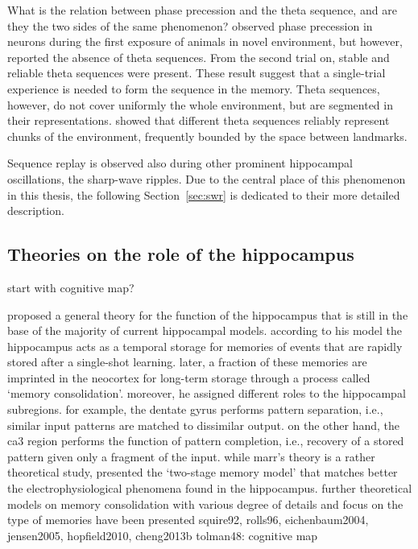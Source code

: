     What is the relation between phase precession and the theta sequence, and
    are they the two sides of the same phenomenon? \cite{Feng2015} observed
    phase precession in neurons during the first exposure of animals in novel
    environment, but however, reported the absence of theta sequences. From the
    second trial on, stable and reliable theta sequences were present. These
    result suggest that a single-trial experience is needed to form the
    sequence in the memory. Theta sequences, however, do not cover uniformly
    the whole environment, but are segmented in their representations. \cite{Gupta2012} 
    showed that different theta sequences reliably represent chunks of the environment,
    frequently bounded by the space between landmarks.

    Sequence replay is observed also during other prominent hippocampal
    oscillations, the sharp-wave ripples. Due to the central place of this
    phenomenon in this thesis, the following Section~\ref{sec:swr} is dedicated
    to their more detailed description.

  \subsection{Theories on the role of the hippocampus} 

    start with cognitive map?

    \citep{Marr1971} proposed a general theory for the function of the
    hippocampus that is still in the base of the majority of current
    hippocampal models. according to his model the hippocampus acts as a
    temporal storage for memories of events that are rapidly stored after a
    single-shot learning. later, a fraction of these memories are imprinted in
    the neocortex for long-term storage through a process called `memory
    consolidation'. moreover, he assigned different roles to the hippocampal
    subregions. for example, the dentate gyrus performs pattern separation,
    i.e., similar input patterns are matched to dissimilar output. on the other
    hand, the ca3 region performs the function of pattern completion, i.e.,
    recovery of a stored pattern given only a fragment of the input. while
    marr's theory is a rather theoretical study, \citep{buzsaki89} presented
    the `two-stage memory model' that matches better the electrophysiological
    phenomena found in the hippocampus. further theoretical models on memory
    consolidation with various degree of details and focus on the type of
    memories have been presented \cite{e.g.,}{}{squire92, rolls96,
    eichenbaum2004, jensen2005, hopfield2010, cheng2013b}
    tolman48: cognitive map


